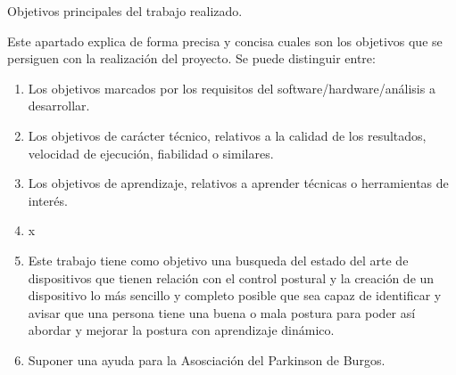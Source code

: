 
Objetivos principales del trabajo realizado.

Este apartado explica de forma precisa y concisa cuales son los objetivos que se persiguen con la realización del proyecto. Se puede distinguir entre:
\begin{enumerate}
    \item Los objetivos marcados por los requisitos del software/hardware/análisis a desarrollar.
    \item Los objetivos de carácter técnico, relativos a la calidad de los resultados, velocidad de ejecución, fiabilidad o similares.
    \item Los objetivos de aprendizaje, relativos a aprender técnicas o herramientas de interés. 
    \item x
    \item Este trabajo tiene como objetivo una busqueda del estado del arte de dispositivos que tienen relación con el control postural y la creación de un dispositivo lo más sencillo y completo posible que sea capaz de identificar y avisar que una persona tiene una buena o mala postura para poder así abordar y mejorar la postura con aprendizaje dinámico.
    
    \item Suponer una ayuda para la Asosciación del Parkinson de Burgos.
    
\end{enumerate}








